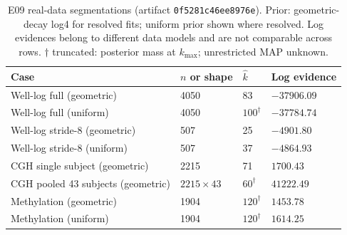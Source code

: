 \begin{table}[!htbp]
\centering
\small
\caption{E09 real-data segmentations (artifact \texttt{0f5281c46ee8976e}). Prior: geometric-decay log4 for resolved fits; uniform prior shown where resolved. Log evidences belong to different data models and are not comparable across rows. $\dagger$ truncated: posterior mass at $k_{\max}$; unrestricted MAP unknown.}
\label{tab:real-summary-paper}
\begin{tabularx}{\columnwidth}{@{}Y C{0.19\columnwidth} C{0.12\columnwidth} C{0.28\columnwidth}@{}}
\toprule
Case & $n$ or shape & $\widehat k$ & Log evidence \\
\midrule
Well-log full (geometric) & 4050 & 83 & $-37906.09$ \\
Well-log full (uniform) & 4050 & $100^{\dagger}$ & $-37784.74$ \\
Well-log stride-8 (geometric) & 507 & 25 & $-4901.80$ \\
Well-log stride-8 (uniform) & 507 & 37 & $-4864.93$ \\
CGH single subject (geometric) & 2215 & 71 & $1700.43$ \\
CGH pooled 43 subjects (geometric) & $2215\times43$ & $60^{\dagger}$ & $41222.49$ \\
Methylation (geometric) & 1904 & $120^{\dagger}$ & $1453.78$ \\
Methylation (uniform) & 1904 & $120^{\dagger}$ & $1614.25$ \\
\bottomrule
\end{tabularx}
\end{table}

